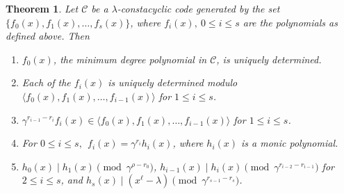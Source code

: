 \documentclass[12pt,a4paper]{article}
\newtheorem{theorem}{Theorem}[section]
\begin{document}
\begin{theorem}
    Let $\mathcal{C}$ be a $\lambda$-constacyclic code generated by the set $\{ f_0(x),f_1(x), \dots , f_s(x) \}$, where $f_i(x),~ 0 \le i \le s$ are the polynomials as defined above. Then
    \begin{enumerate}
        \item $f_0(x)$, the minimum degree polynomial in $\mathcal{C}$, is uniquely determined.
        \item Each of the $f_i(x)$ is uniquely determined modulo $\langle f_0(x),f_1(x), \dots , f_{i-1}(x) \rangle$ for $1 \le i \le s$.
        \item $\gamma^{r_{i-1}-r_i}f_i(x) \in \langle f_0(x), f_1(x), \dots, f_{i-1}(x) \rangle$ for $1 \le i \le s$. \label{thm:parttwo}
        \item For $0 \le i \le s,~~ f_i(x)=\gamma^{r_i}h_i(x)$, where $h_i(x)$ is a monic polynomial.\label{thm:partthree}
        \item $h_0(x) \mid h_1(x) \pmod{\gamma^{\rho-r_0}}$, $h_{i-1}(x) \mid h_i(x) \pmod{\gamma^{r_{i-2}-r_{i-1}}}$ for $2 \le i \le s$, and $h_s(x) \mid (x^{\ell}-\lambda) \pmod{\gamma^{r_{s-1}-r_s}}$.
    \end{enumerate}
\end{theorem}
\end{document}
